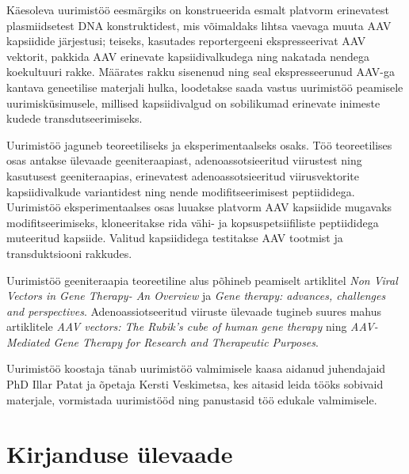 \documentclass{trkut}%
\begin{document}
Käesoleva uurimistöö eesmärgiks on konstrueerida esmalt platvorm erinevatest plasmiidsetest DNA konstruktidest, mis võimaldaks lihtsa vaevaga muuta AAV kapsiidide järjestusi; teiseks, kasutades reportergeeni ekspresseerivat AAV vektorit, pakkida AAV erinevate kapsiidivalkudega ning nakatada nendega koekultuuri rakke. Määrates rakku sisenenud ning seal ekspresseerunud AAV-ga kantava geneetilise materjali hulka, loodetakse saada vastus uurimistöö peamisele uurimisküsimusele, millised kapsiidivalgud on sobilikumad erinevate inimeste kudede transdutseerimiseks.

Uurimistöö jaguneb teoreetiliseks ja eksperimentaalseks osaks. Töö teoreetilises osas antakse ülevaade geeniteraapiast, adenoassotsieeritud viirustest ning kasutusest geeniteraapias, erinevatest adenoassotsieeritud viirusvektorite kapsiidivalkude variantidest ning nende modifitseerimisest peptiididega. Uurimistöö eksperimentaalses osas luuakse platvorm AAV kapsiidide mugavaks modifitseerimiseks, kloneeritakse rida vähi- ja kopsuspetsiifiliste peptiididega muteeritud kapsiide. Valitud kapsiididega testitakse AAV tootmist ja transduktsiooni rakkudes.

Uurimistöö geeniteraapia teoreetiline alus põhineb peamiselt artiklitel \textit{Non Viral Vectors in Gene Therapy- An Overview} ja \textit{Gene therapy: advances, challenges and perspectives}. Adenoassiotseeritud viiruste ülevaade tugineb suures mahus artiklitele \textit{AAV vectors: The Rubik’s cube of human gene therapy} ning \textit{AAV-Mediated Gene Therapy for Research and Therapeutic Purposes}.

Uurimistöö koostaja tänab uurimistöö valmimisele kaasa aidanud juhendajaid PhD Illar Patat ja õpetaja Kersti Veskimetsa, kes aitasid leida tööks sobivaid materjale, vormistada uurimistööd ning panustasid töö edukale valmimisele.

\chapter{Kirjanduse ülevaade}
\end{document}
